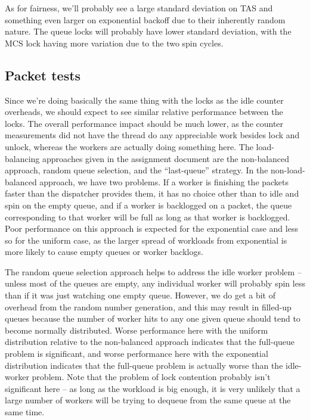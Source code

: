 \documentclass{article}
\begin{document}
As for fairness, we'll probably see a large standard deviation on TAS and something even larger on exponential backoff due to their inherently random nature. The queue locks will probably have lower standard deviation, with the MCS lock having more variation due to the two spin cycles.
\subsection*{Packet tests}
Since we're doing basically the same thing with the locks as the idle counter overheads, we should expect to see similar relative performance between the locks. The overall performance impact should be much lower, as the counter measurements did not have the thread do any appreciable work besides lock and unlock, whereas the workers are actually doing something here.
The load-balancing approaches given in the assignment document are the non-balanced approach, random queue selection, and the ``last-queue'' strategy. In the non-load-balanced approach, we have two problems. If a worker is finishing the packets faster than the dispatcher provides them, it has no choice other than to idle and spin on the empty queue, and if a worker is backlogged on a packet, the queue corresponding to that worker will be full as long as that worker is backlogged. Poor performance on this approach is expected for the exponential case and less so for the uniform case, as the larger spread of workloads from exponential is more likely to cause empty queues or worker backlogs.

The random queue selection approach helps to address the idle worker problem -- unless most of the queues are empty, any individual worker will probably spin less than if it was just watching one empty queue. However, we do get a bit of overhead from the random number generation, and this may result in filled-up queues because the number of worker hits to any one given queue should tend to become normally distributed. Worse performance here with the uniform distribution relative to the non-balanced approach indicates that the full-queue problem is significant, and worse performance here with the exponential distribution indicates that the full-queue problem is actually worse than the idle-worker problem. Note that the problem of lock contention probably isn't significant here -- as long as the workload is big enough, it is very unlikely that a large number of workers will be trying to dequeue from the same queue at the same time.
\end{document}

